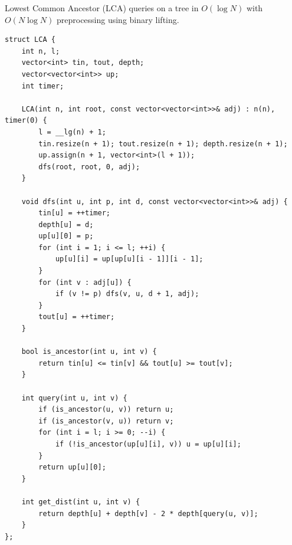 
Lowest Common Ancestor (LCA) queries on a tree in $O(\log N)$ with $O(N \log N)$ preprocessing using binary lifting.
\begin{lstlisting}
struct LCA {
    int n, l;
    vector<int> tin, tout, depth;
    vector<vector<int>> up;
    int timer;

    LCA(int n, int root, const vector<vector<int>>& adj) : n(n), timer(0) {
        l = __lg(n) + 1;
        tin.resize(n + 1); tout.resize(n + 1); depth.resize(n + 1);
        up.assign(n + 1, vector<int>(l + 1));
        dfs(root, root, 0, adj);
    }

    void dfs(int u, int p, int d, const vector<vector<int>>& adj) {
        tin[u] = ++timer;
        depth[u] = d;
        up[u][0] = p;
        for (int i = 1; i <= l; ++i) {
            up[u][i] = up[up[u][i - 1]][i - 1];
        }
        for (int v : adj[u]) {
            if (v != p) dfs(v, u, d + 1, adj);
        }
        tout[u] = ++timer;
    }

    bool is_ancestor(int u, int v) {
        return tin[u] <= tin[v] && tout[u] >= tout[v];
    }

    int query(int u, int v) {
        if (is_ancestor(u, v)) return u;
        if (is_ancestor(v, u)) return v;
        for (int i = l; i >= 0; --i) {
            if (!is_ancestor(up[u][i], v)) u = up[u][i];
        }
        return up[u][0];
    }

    int get_dist(int u, int v) {
        return depth[u] + depth[v] - 2 * depth[query(u, v)];
    }
};
\end{lstlisting}
